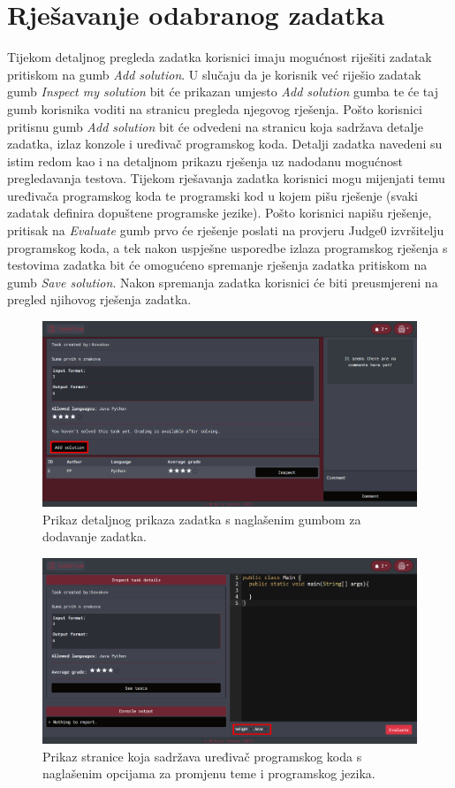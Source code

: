 \documentclass[times, utf8, zavrsni, numeric]{fer}
\begin{document}
		\section{Rješavanje odabranog zadatka}
		Tijekom detaljnog pregleda zadatka korisnici imaju mogućnost riješiti zadatak pritiskom na gumb \textit{Add solution}. U slučaju da je korisnik već riješio zadatak gumb \textit{Inspect my solution} bit će prikazan umjesto \textit{Add solution} gumba te će taj gumb korisnika voditi na stranicu pregleda njegovog rješenja. Pošto korisnici pritisnu gumb \textit{Add solution} bit će odvedeni na stranicu koja sadržava detalje zadatka, izlaz konzole i uređivač programskog koda. Detalji zadatka navedeni su istim redom kao i na detaljnom prikazu rješenja uz nadodanu mogućnost pregledavanja testova. Tijekom rješavanja zadatka korisnici mogu mijenjati temu uređivača programskog koda te programski kod u kojem pišu rješenje (svaki zadatak definira dopuštene programske jezike). Pošto korisnici napišu rješenje, pritisak na \textit{Evaluate} gumb prvo će rješenje poslati na provjeru Judge0 izvršitelju programskog koda, a tek nakon uspješne usporedbe izlaza programskog rješenja s testovima zadatka bit će omogućeno spremanje rješenja zadatka pritiskom na gumb \textit{Save solution}. Nakon spremanja zadatka korisnici će biti preusmjereni na pregled njihovog rješenja zadatka.
		\begin{figure}[H]
			\centering
			\includegraphics[width=\linewidth]{pictures/koristenje/DodajRjesenje.png}
			\caption{Prikaz detaljnog prikaza zadatka s naglašenim gumbom za dodavanje zadatka.}
			\label{fig:dodajrjesenje}
		\end{figure}
		\begin{figure}[H]
			\centering
			\includegraphics[width=\linewidth]{pictures/koristenje/StranicaRjesavanja.png}
			\caption{Prikaz stranice koja sadržava uređivač programskog koda s naglašenim opcijama za promjenu teme i programskog jezika.}
			\label{fig:rjesavanje}
		\end{figure}
\end{document}
